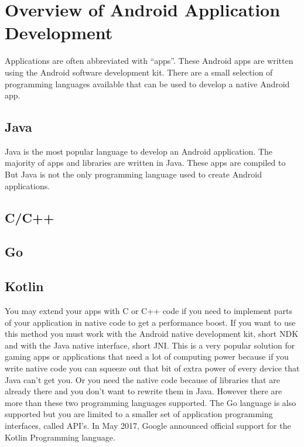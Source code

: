 \section{Overview of Android Application Development}
 Applications are often abbreviated with ``apps''. These Android apps are written using the Android software development kit. There are a small selection of programming languages available that can be used to develop a native Android app.

\subsection{Java}
Java is the most popular language to develop an Android application. The majority of apps and libraries are written in Java. These apps are compiled to
But Java is not the only programming language used to create Android applications.
\subsection{C/C++}

\subsection{Go}

\subsection{Kotlin}
You may extend your apps with C or C++ code if you need to implement parts of your application in native code to get a performance boost. If you want to use this method you must work with the Android native development kit, short NDK and with the Java native interface, short JNI.  This is a very popular solution for gaming apps or applications that need a lot of computing power because if you write native code you can squeeze out that bit of extra power of every device that Java can't get you. Or you need the native code because of libraries that are already there and you don't want to rewrite them in Java. However there are more than these two programming languages supported. The Go language is also supported but you are limited to a smaller set of application programming interfaces, called API's. In May 2017, Google announced official support for the Kotlin Programming language.